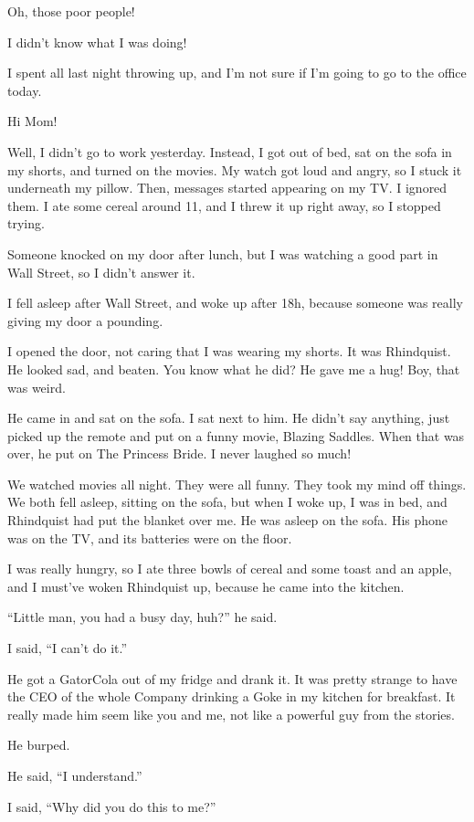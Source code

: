 Oh, those poor people!

I didn't know what I was doing!

I spent all last night throwing up, and I'm not sure if I'm going to go 
to the office today.

\tb

Hi Mom!

Well, I didn't go to work yesterday. Instead, I got out of bed, sat on 
the sofa in my shorts, and turned on the movies. My watch got loud and 
angry, so I stuck it underneath my pillow. Then, messages started 
appearing on my TV. I ignored them. I ate some cereal around 11, and I 
threw it up right away, so I stopped trying.

Someone knocked on my door after lunch, but I was watching a good part 
in Wall Street, so I didn't answer it.

I fell asleep after Wall Street, and woke up after 18h, because someone 
was really giving my door a pounding.

I opened the door, not caring that I was wearing my shorts. It was 
Rhindquist. He looked sad, and beaten. You know what he did? He gave me 
a hug! Boy, that was weird.

He came in and sat on the sofa. I sat next to him. He didn't say 
anything, just picked up the remote and put on a funny movie, Blazing 
Saddles. When that was over, he put on The Princess Bride. I never 
laughed so much!

We watched movies all night. They were all funny. They took my mind off 
things. We both fell asleep, sitting on the sofa, but when I woke up, I 
was in bed, and Rhindquist had put the blanket over me. He was asleep 
on the sofa. His phone was on the TV, and its batteries were on the 
floor.

I was really hungry, so I ate three bowls of cereal and some toast and 
an apple, and I must've woken Rhindquist up, because he came into the 
kitchen.

“Little man, you had a busy day, huh?” he said.

I said, “I can't do it.”

He got a GatorCola out of my fridge and drank it. It was pretty strange 
to have the CEO of the whole Company drinking a Goke in my kitchen for 
breakfast. It really made him seem like you and me, not like a powerful 
guy from the stories.

He burped.

He said, “I understand.”

I said, “Why did you do this to me?”

